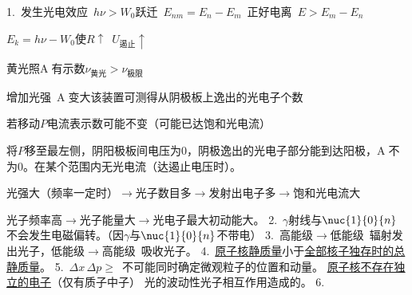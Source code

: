 1.\ 发生光电效应\ $h\nu>W_0$\quad 跃迁\ $E_{nm}=E_n-E_m$\ 正好\quad 电离\ $E>E_m-E_n$ %

$E_k=h\nu-W_0$\hfill 使$R\uparrow$\ $U_{\text{遏止}}\uparrow$ %

黄光照\textcircled{A}有示数\quad $\nu_{\text{黄光}}>\nu_{\text{极限}}$ %

增加光强\ \textcircled{A}变大\qquad 该装置可测得从阴极板上逸出的光电子个数

若移动$P$电流表示数可能不变（可能已达饱和光电流） %

将$P$移至最左侧，阴阳极板间电压为0，阴极逸出的光电子部分能到达阳极，\textcircled{A}不为0。在某个范围内无光电流（达遏止电压时）。

光强大（频率一定时）$\to$光子数目多$\to$发射出电子多$\to$饱和光电流大

光子频率高$\to$光子能量大$\to$光电子最大初动能大。
2.\ $\gamma$射线与$\nuc{1}{0}{n}$不会发生电磁偏转。（因$\gamma$与$\nuc{1}{0}{n}$不带电）
3.\ 高能级$\to$低能级\ 辐射发出光子，低能级$\to$高能级\ 吸收光子。
4.\ \underline{原子核静质量}小于\underline{全部核子独存时的总静质量}。 %
5.\ $\Delta x\,\Delta p\ge$\ 不可能同时确定微观粒子的位置和动量。 %
\underline{原子核不存在独立的电子}（仅有质子中子）
光的波动性光子相互作用造成的。
6.


